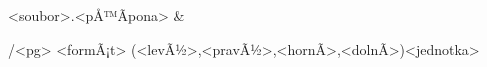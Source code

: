 \inspic <soubor>.<pÅ™Ã­pona> %
 &%


\magscale[<faktor>]  %
\margins/<pg> <formÃ¡t> (<levÃ½>,<pravÃ½>,<hornÃ­>,<dolnÃ­>)<jednotka>  %

\report {} %
\endtt

\bye


